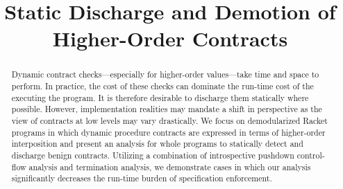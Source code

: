 \documentclass{sigplanconf}
\title{Static Discharge and Demotion of Higher-Order Contracts}
\begin{document}
\newcommand{\chapcalc}[0]{\ensuremath{\lambda_{\mathcal{C}}}}

% 


\maketitle

\begin{abstract}
Dynamic contract checks---especially for higher-order values---take time and space to perform.
In practice, the cost of these checks can dominate the run-time cost of the executing the program.
It is therefore desirable to discharge them statically where possible.
However, implementation realities may mandate a shift in perspective as the view of contracts at low levels may vary drastically.
We focus on demodularized Racket programs in which dynamic procedure contracts are expressed in terms of higher-order interposition and present an analysis for whole programs to statically detect and discharge benign contracts.
Utilizing a combination of introspective pushdown control-flow analysis and termination analysis, we demonstrate cases in which our analysis significantly decreases the run-time burden of specification enforcement.
\end{abstract}





% 



\end{document}
